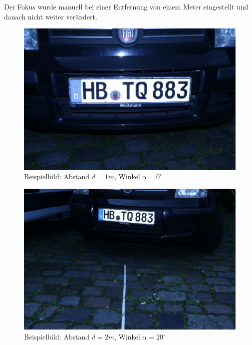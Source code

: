 \documentclass{../Vorlage/sebDenCls}
\begin{document}
Der Fokus wurde manuell bei einer Entfernung von einem Meter eingestellt und danach nicht weiter verändert. 

\begin{figure}[htp]
	\centering 	
	\includegraphics[width=.9\textwidth]{beispielbild} 
	\caption{Beispielbild: Abstand $d=1m$, Winkel $\alpha = 0^\circ$ \label{beispiel}}
\end{figure}

\begin{figure}[htp]
	\centering 	
	\includegraphics[width=.9\textwidth]{beispielbild2} 
	\caption{Beispielbild: Abstand $d=2m$, Winkel $\alpha = 20^\circ$ \label{beispiel2}}
\end{figure}

\section{}
\end{document}
